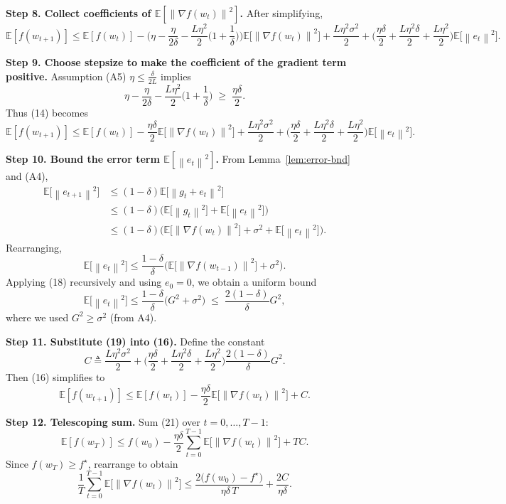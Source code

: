 \documentclass{article}
\newcommand{\E}{\mathbb{E}}
\newcommand{\norm}[1]{\left\|#1\right\|}
\newcommand{\grad}{\nabla}
\begin{document}
\noindent\textbf{Step 8. Collect coefficients of $\E[\norm{\grad f(w_t)}^{2}]$.}  
After simplifying,
\[
\E[f(w_{t+1})]\le \E[f(w_t)]
-\Big(\eta-\frac{\eta}{2\delta}-\frac{L\eta^{2}}{2}\big(1+\frac{1}{\delta}\big)\Big)
\E\!\big[\norm{\grad f(w_t)}^{2}\big]
+\frac{L\eta^{2}\sigma^{2}}{2}
+\Big(\frac{\eta\delta}{2}+\frac{L\eta^{2}\delta}{2}+\frac{L\eta^{2}}{2}\Big)\E\!\big[\norm{e_t}^{2}\big].
\tag{14}
\]

\noindent\textbf{Step 9. Choose stepsize to make the coefficient of the gradient term positive.}  
Assumption (A5) $\eta\le\frac{\delta}{2L}$ implies
\[
\eta-\frac{\eta}{2\delta}-\frac{L\eta^{2}}{2}\big(1+\frac{1}{\delta}\big)\;\ge\;\frac{\eta\delta}{2}.
\tag{15}
\]
Thus (14) becomes
\[
\E[f(w_{t+1})]\le \E[f(w_t)]
-\frac{\eta\delta}{2}\E\!\big[\norm{\grad f(w_t)}^{2}\big]
+\frac{L\eta^{2}\sigma^{2}}{2}
+\Big(\frac{\eta\delta}{2}+\frac{L\eta^{2}\delta}{2}+\frac{L\eta^{2}}{2}\Big)\E\!\big[\norm{e_t}^{2}\big].
\tag{16}
\]

\noindent\textbf{Step 10. Bound the error term $\E[\norm{e_t}^{2}]$.}  
From Lemma~\ref{lem:error-bnd} and (A4),
\[
\begin{aligned}
\E\!\big[\norm{e_{t+1}}^{2}\big]
&\le (1-\delta)\E\!\big[\norm{g_t+e_t}^{2}\big] \\
&\le (1-\delta)\Big(\E\!\big[\norm{g_t}^{2}\big]+\E\!\big[\norm{e_t}^{2}\big]\Big) \\
&\le (1-\delta)\Big(\E\!\big[\norm{\grad f(w_t)}^{2}\big]+\sigma^{2}+\E\!\big[\norm{e_t}^{2}\big]\Big).
\end{aligned}
\tag{17}
\]
Rearranging,
\[
\E\!\big[\norm{e_t}^{2}\big]\le \frac{1-\delta}{\delta}\Big(\E\!\big[\norm{\grad f(w_{t-1})}^{2}\big]+\sigma^{2}\Big).
\tag{18}
\]
Applying (18) recursively and using $e_0=0$, we obtain a uniform bound
\[
\E\!\big[\norm{e_t}^{2}\big]\le \frac{1-\delta}{\delta}\big(G^{2}+\sigma^{2}\big)\;\le\;\frac{2(1-\delta)}{\delta}G^{2},
\tag{19}
\]
where we used $G^{2}\ge\sigma^{2}$ (from A4).

\noindent\textbf{Step 11. Substitute (19) into (16).}  
Define the constant
\[
C\triangleq\frac{L\eta^{2}\sigma^{2}}{2}
+\Big(\frac{\eta\delta}{2}+\frac{L\eta^{2}\delta}{2}+\frac{L\eta^{2}}{2}\Big)
\frac{2(1-\delta)}{\delta}G^{2}.
\tag{20}
\]
Then (16) simplifies to
\[
\E[f(w_{t+1})]\le \E[f(w_t)]
-\frac{\eta\delta}{2}\E\!\big[\norm{\grad f(w_t)}^{2}\big]+C.
\tag{21}
\]

\noindent\textbf{Step 12. Telescoping sum.}  
Sum (21) over $t=0,\dots,T-1$:
\[
\E[f(w_T)]\le f(w_0)-\frac{\eta\delta}{2}\sum_{t=0}^{T-1}\E\!\big[\norm{\grad f(w_t)}^{2}\big]+TC.
\tag{22}
\]
Since $f(w_T)\ge f^{\star}$, rearrange to obtain
\[
\frac{1}{T}\sum_{t=0}^{T-1}\E\!\big[\norm{\grad f(w_t)}^{2}\big]
\le \frac{2\big(f(w_0)-f^{\star}\big)}{\eta\delta\,T}
+\frac{2C}{\eta\delta}.
\tag{23}
\]
\end{document}
